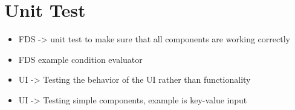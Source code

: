 \section{Unit Test}


  \begin{itemize}
   \item FDS -> unit test to make sure that all components are working correctly
   \item FDS example condition evaluator
   \item UI -> Testing the behavior of the UI rather than functionality
   \item UI -> Testing simple components, example is key-value input
  \end{itemize}